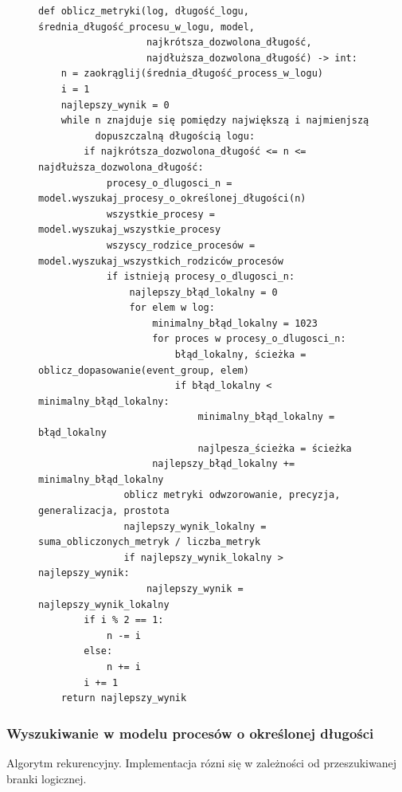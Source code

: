 \begin{figure}[!ht]
\lstset{caption=Obliczanie metryk, captionpos=b}
\lstset{label=src:best_result, frame=single}
\begin{lstlisting}
def oblicz_metryki(log, długość_logu, średnia_długość_procesu_w_logu, model, 
				   najkrótsza_dozwolona_długość, 
				   najdłuższa_dozwolona_długość) -> int:
    n = zaokrąglij(średnia_długość_process_w_logu)
    i = 1
    najlepszy_wynik = 0
    while n znajduje się pomiędzy największą i najmienjszą 
    	  dopuszczalną długością logu:
        if najkrótsza_dozwolona_długość <= n <= najdłuższa_dozwolona_długość:
            procesy_o_dlugosci_n = model.wyszukaj_procesy_o_określonej_długości(n)
            wszystkie_procesy = model.wyszukaj_wszystkie_procesy
            wszyscy_rodzice_procesów = model.wyszukaj_wszystkich_rodziców_procesów
            if istnieją procesy_o_dlugosci_n:
                najlepszy_błąd_lokalny = 0
                for elem w log:
                    minimalny_błąd_lokalny = 1023
                    for proces w procesy_o_dlugosci_n:
                        błąd_lokalny, ścieżka = oblicz_dopasowanie(event_group, elem)
                        if błąd_lokalny < minimalny_błąd_lokalny:
                            minimalny_błąd_lokalny = błąd_lokalny
                            najlpesza_ścieżka = ścieżka
                    najlepszy_błąd_lokalny += minimalny_błąd_lokalny
               oblicz metryki odwzorowanie, precyzja, generalizacja, prostota 
               najlepszy_wynik_lokalny = suma_obliczonych_metryk / liczba_metryk
               if najlepszy_wynik_lokalny > najlepszy_wynik:
                   najlepszy_wynik = najlepszy_wynik_lokalny
        if i % 2 == 1:
            n -= i
        else:
            n += i
        i += 1
    return najlepszy_wynik
\end{lstlisting}
\end{figure}

\subsubsection{Wyszukiwanie w modelu procesów o określonej długości}

Algorytm rekurencyjny. Implementacja rózni się w zależności od przeszukiwanej branki logicznej.
\begin{figure}[!ht]
\lstset{caption=Wyszukiwanie procesów o długości n, captionpos=b}
\lstset{label=src:get_n_length, frame=single}
\begin{lstlisting}
\end{lstlisting}
\end{figure}

